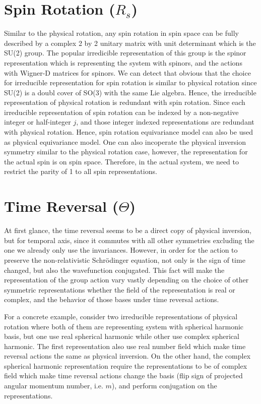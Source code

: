 \documentclass[reprint, 10pt]{revtex4-2}
\begin{document}
\section{Spin Rotation ($R_s$)}
Similar to the physical rotation, any spin rotation in spin space can be fully described by a complex 2 by 2 unitary matrix
with unit determinant which is the SU(2) group. The popular irredicible representation of this group is the spinor representation
which is representing the system with spinors, and the actions with Wigner-D matrices for spinors. We can detect that obvious
that the choice for irreducible representation for spin rotation is similar to physical rotation since SU(2) is a doubl cover
of SO(3) with the same Lie algebra. Hence, the irreducible representation of physical rotation is redundant with spin rotation.
Since each irreducible representation of spin rotation can be indexed by a non-negative integer or half-integer $j$, 
and those integer indexed representations are redundant with physical rotation. Hence, spin rotation equivariance model can
also be used as physical equivariance model. One can also incoperate the physical inversion symmetry similar to the physical rotation case, 
however, the representation for the actual spin is on spin space. Therefore, in the actual system, we need to restrict
the parity of 1 to all spin representations.

\section{Time Reversal ($\Theta$)}
At first glance, the time reversal seems to be a direct copy of physical inversion, but for temporal axis, since it commutes
with all other symmetries excluding the one we already only use the invariances. However, in order for the action to preserve 
the non-relativistic Schr\"odinger equation, not only is the sign of time changed, but also the wavefunction conjugated. 
This fact will make the representation of the group action vary vastly depending on the choice of other symmetric 
representations whether the field of the representation is real or complex, and the behavior
of those bases under time reversal actions. 

For a concrete example, consider two irreducible representations of physical
rotation where both of them are representing system with spherical harmonic basis, but one use real spherical harmonic
while other use complex spherical harmonic. The first representation also use real number field which make time reversal
actions the same as physical inversion. On the other hand, the complex spherical harmonic representation require the 
representations to be of complex field which make time reversal actions change the basis (flip sign of projected angular 
momentum number, i.e. $m$), and perform conjugation on the representations. 
\end{document}
